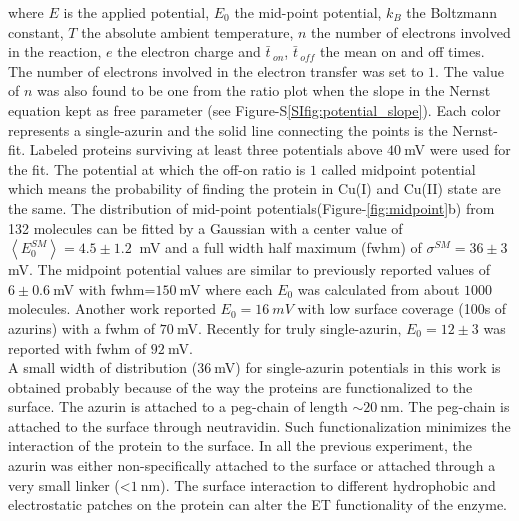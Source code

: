 \documentclass[journal=jacsat,manuscript=article]{achemso}
\newcommand*\me[1]{\ensuremath{\bar{#1}\,}}
\begin{document}
where $E$ is the applied potential, $E_0$ the mid-point potential, $k_B$ the Boltzmann constant, $T$ the absolute ambient temperature, $n$ the number of electrons involved in the reaction, $e$ the electron charge and $\me{t}_{on}$, $\me{t}_{off}$ the mean on and off times. The number of electrons involved in the electron transfer was set to $1$. The value of $n$ was also found to be one from the ratio plot when the slope in the Nernst equation kept as free parameter (see Figure-S\ref{SIfig:potential_slope}). Each color represents a single-azurin and the solid line connecting the points is the Nernst-fit. Labeled proteins surviving at least three potentials above $40~$mV were used for the fit. The potential at which the off-on ratio is $1$ called midpoint potential which means the probability of finding the protein in Cu(I) and Cu(II) state are the same. The distribution of mid-point potentials(Figure-\ref{fig:midpoint}b) from 132 molecules can be fitted by a Gaussian with a center value of $\left<E_0^{SM}\right>=4.5 \pm 1.2~$ mV and a full width half maximum (fwhm) of $\sigma^{SM}=36 \pm 3~$ mV. The midpoint potential values are similar to previously reported values of $6\pm0.6~$mV with fwhm=$150~$mV where each $E_0$ was calculated from about $1000$ molecules.\cite{davis2006monitoring} Another work reported $E_0 = 16~mV$ with low surface coverage (100s of azurins) with a fwhm of $70~$mV.\cite{salverda2010fluorescent} Recently for truly single-azurin, $E_0=12\pm3$ was reported with fwhm of $92~$mV.\cite{akkilic2014chemically-induced}\\
A small width of distribution ($36~$mV) for single-azurin potentials in this work is obtained probably because of the way the proteins are functionalized to the surface. The azurin is attached to a peg-chain of length ${\sim}20~$nm. The peg-chain is attached to the surface through neutravidin. Such functionalization minimizes the interaction of the protein to the surface. In all the previous experiment, the azurin was either non-specifically attached to the surface or attached through a very small linker (<$1~$nm). The surface interaction to different hydrophobic and electrostatic patches on the protein can alter the ET functionality of the enzyme.
\end{document}
